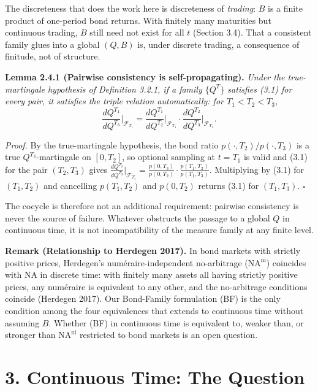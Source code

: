 \documentclass[
]{article}
\begin{document}
The discreteness that does the work here is discreteness of
\emph{trading}: \(B\) is a finite product of one-period bond returns.
With finitely many maturities but continuous trading, \(B\) still need
not exist for all \(t\) (Section 3.4). That a consistent family glues
into a global \((Q, B)\) is, under discrete trading, a consequence of
finitude, not of structure.

\textbf{Lemma 2.4.1 (Pairwise consistency is self-propagating).}
\emph{Under the true-martingale hypothesis of Definition 3.2.1, if a
family \(\{Q^T\}\) satisfies (3.1) for every pair, it satisfies the
triple relation automatically: for \(T_1 < T_2 < T_3\),}
\[\frac{dQ^{T_1}}{dQ^{T_3}}\bigg|_{\mathcal{F}_{T_1}} = \frac{dQ^{T_1}}{dQ^{T_2}}\bigg|_{\mathcal{F}_{T_1}} \cdot \frac{dQ^{T_2}}{dQ^{T_3}}\bigg|_{\mathcal{F}_{T_1}}.\]

\emph{Proof.} By the true-martingale hypothesis, the bond ratio
\(p(\cdot,T_2)/p(\cdot,T_3)\) is a true \(Q^{T_3}\)-martingale on
\([0,T_2]\), so optional sampling at \(t = T_1\) is valid and (3.1) for
the pair \((T_2, T_3)\) gives
\(\frac{dQ^{T_2}}{dQ^{T_3}}\big|_{\mathcal{F}_{T_1}}
= \frac{p(0,T_3)}{p(0,T_2)} \cdot \frac{p(T_1,T_2)}{p(T_1,T_3)}\).
Multiplying by (3.1) for \((T_1, T_2)\) and cancelling \(p(T_1,T_2)\)
and \(p(0,T_2)\) returns (3.1) for \((T_1, T_3)\). \(\square\)

The cocycle is therefore not an additional requirement: pairwise
consistency is never the source of failure. Whatever obstructs the
passage to a global \(Q\) in continuous time, it is not incompatibility
of the measure family at any finite level.

\textbf{Remark (Relationship to Herdegen 2017).} In bond markets with
strictly positive prices, Herdegen's numéraire-independent no-arbitrage
(\(\text{NA}^{\text{ni}}\)) coincides with NA in discrete time: with
finitely many assets all having strictly positive prices, any numéraire
is equivalent to any other, and the no-arbitrage conditions coincide
(Herdegen 2017). Our Bond-Family formulation (BF) is the only condition
among the four equivalences that extends to continuous time without
assuming \(B\). Whether (BF) in continuous time is equivalent to, weaker
than, or stronger than \(\text{NA}^{\text{ni}}\) restricted to bond
markets is an open question.

\section{3. Continuous Time: The
Question}\label{continuous-time-the-question}
\end{document}

